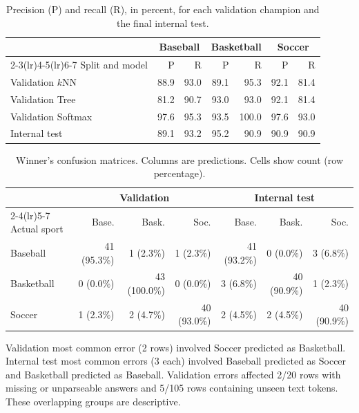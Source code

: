 \documentclass[12pt]{article}
\newcommand{\knn}{$k$NN}
\begin{document}
\begin{table}[h]
\centering
\small
\begin{tabular}{lrrrrrr}
\toprule
 & \multicolumn{2}{c}{Baseball} & \multicolumn{2}{c}{Basketball} & \multicolumn{2}{c}{Soccer} \\
\cmidrule(lr){2-3}\cmidrule(lr){4-5}\cmidrule(lr){6-7}
Split and model & P & R & P & R & P & R \\
\midrule
Validation \knn     & 88.9 & 93.0 & 89.1 & 95.3  & 92.1 & 81.4 \\
Validation Tree     & 81.2 & 90.7 & 93.0 & 93.0  & 92.1 & 81.4 \\
Validation Softmax  & 97.6 & 95.3 & 93.5 & 100.0 & 97.6 & 93.0 \\
Internal test       & 89.1 & 93.2 & 95.2 & 90.9  & 90.9 & 90.9 \\
\bottomrule
\end{tabular}
\caption{Precision (P) and recall (R), in percent, for each validation
champion and the final internal test.}
\label{tab:per-class}
\end{table}

\begin{table}[h]
\centering
\small
\setlength{\tabcolsep}{4pt}
\begin{tabular}{lrrrrrr}
\toprule
 & \multicolumn{3}{c}{Validation} & \multicolumn{3}{c}{Internal test} \\
\cmidrule(lr){2-4}\cmidrule(lr){5-7}
Actual sport & Base. & Bask. & Soc. & Base. & Bask. & Soc. \\
\midrule
Baseball   & 41 (95.3\%) & 1 (2.3\%)    & 1 (2.3\%)   & 41 (93.2\%) & 0 (0.0\%)   & 3 (6.8\%) \\
Basketball & 0 (0.0\%)   & 43 (100.0\%) & 0 (0.0\%)   & 3 (6.8\%)   & 40 (90.9\%) & 1 (2.3\%) \\
Soccer     & 1 (2.3\%)   & 2 (4.7\%)    & 40 (93.0\%) & 2 (4.5\%)   & 2 (4.5\%)   & 40 (90.9\%) \\
\bottomrule
\end{tabular}
\caption{Winner's confusion matrices. Columns are predictions. Cells show
count (row percentage).}
\label{tab:confusion}
\end{table}

Validation most common error (2 rows) involved Soccer predicted as
Basketball. Internal test most common errors (3 each) involved Baseball
predicted as Soccer and Basketball predicted as Baseball. Validation errors
affected 2/20 rows with missing or unparseable answers and 5/105 rows
containing unseen text tokens. These overlapping groups are descriptive.
\end{document}
